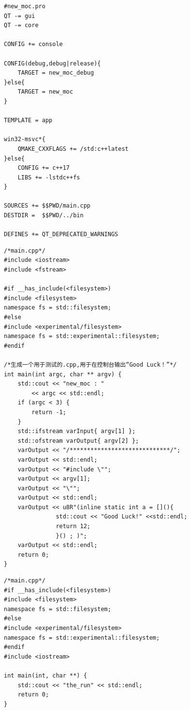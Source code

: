 \FloatBarrier
\begin{lstlisting}[label=f00000b,
caption=GoodLuck,
title=\lstlistingname\ \thelstlisting
]
#new_moc.pro
QT -= gui
QT -= core

CONFIG += console

CONFIG(debug,debug|release){
    TARGET = new_moc_debug
}else{
    TARGET = new_moc
}

TEMPLATE = app

win32-msvc*{
    QMAKE_CXXFLAGS += /std:c++latest
}else{
    CONFIG += c++17
    LIBS += -lstdc++fs
}

SOURCES += $$PWD/main.cpp
DESTDIR =  $$PWD/../bin

DEFINES += QT_DEPRECATED_WARNINGS
\end{lstlisting}          %
\FloatBarrier
\begin{lstlisting}[label=f00000c,
caption=GoodLuck,
title=\lstlistingname\ \thelstlisting
]
/*main.cpp*/
#include <iostream>
#include <fstream>

#if __has_include(<filesystem>)
#include <filesystem>
namespace fs = std::filesystem;
#else
#include <experimental/filesystem>
namespace fs = std::experimental::filesystem;
#endif

/*生成一个用于测试的.cpp,用于在控制台输出“Good Luck！”*/
int main(int argc, char ** argv) {
    std::cout << "new_moc : "
        << argc << std::endl;
    if (argc < 3) {
        return -1;
    }
    std::ifstream varInput{ argv[1] };
    std::ofstream varOutput{ argv[2] };
    varOutput << "/*****************************/";
    varOutput << std::endl;
    varOutput << "#include \"";
    varOutput << argv[1];
    varOutput << "\"";
    varOutput << std::endl;
    varOutput << u8R"(inline static int a = [](){
               std::cout << "Good Luck!" <<std::endl;
               return 12;
               }() ; )";
    varOutput << std::endl;
    return 0;
}
\end{lstlisting}          %

\FloatBarrier
\begin{lstlisting}[label=f00000a,
caption=GoodLuck,
title=\lstlistingname\ \thelstlisting
]
/*main.cpp*/
#if __has_include(<filesystem>)
#include <filesystem>
namespace fs = std::filesystem;
#else
#include <experimental/filesystem>
namespace fs = std::experimental::filesystem;
#endif
#include <iostream>

int main(int, char **) {
    std::cout << "the_run" << std::endl;
    return 0;
}
\end{lstlisting}          %


